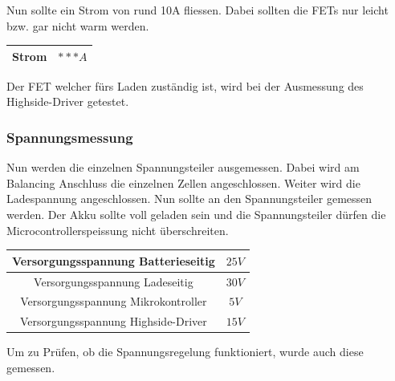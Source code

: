 Nun sollte ein Strom von rund 10A fliessen. Dabei sollten die FETs nur leicht bzw. gar nicht warm werden.

\begin{center}
	\begin{tabular}{|c|c|}
		\hline 
		Strom & $***A$ \\ \hline
	\end{tabular} 
	\label{tab:StromMotorcontrollFET}
\end{center}

Der FET welcher fürs Laden zuständig ist, wird bei der Ausmessung des Highside-Driver getestet.

\subsubsection*{Spannungsmessung}
Nun werden die einzelnen Spannungsteiler ausgemessen. Dabei wird am Balancing Anschluss die einzelnen Zellen angeschlossen. Weiter wird die Ladespannung angeschlossen. Nun sollte an den Spannungsteiler gemessen werden. Der Akku sollte voll geladen sein und die Spannungsteiler dürfen die Microcontrollerspeissung nicht überschreiten.

\begin{center}
	\begin{tabular}{|c|c|}
		\hline 
		Versorgungsspannung Batterieseitig & $25V$ \\ \hline
		Versorgungsspannung Ladeseitig & $30V$ \\ \hline
		Versorgungsspannung Mikrokontroller & $5V$ \\ \hline
		Versorgungsspannung Highside-Driver & $15V$ \\ \hline
		
	\end{tabular} 
	\label{tab:BedingungSpannungsmessungen}
\end{center}

Um zu Prüfen, ob die Spannungsregelung funktioniert, wurde auch diese gemessen.


